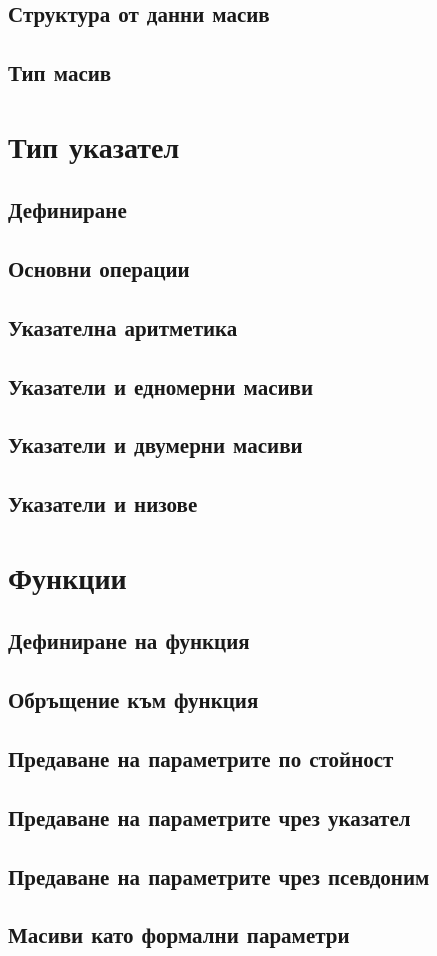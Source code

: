 \documentclass[fleqn,12pt]{article}
\begin{document}
\begin{flushleft}
\subsection{Структура от данни масив}
\subsection{Тип масив}

\section{Тип указател}
\subsection{Дефиниране}
\subsection{Основни операции}
\subsection{Указателна аритметика}
\subsection{Указатели и едномерни масиви}
\subsection{Указатели и двумерни масиви}
\subsection{Указатели и низове}

\section{Функции}
\subsection{Дефиниране на функция}
\subsection{Обръщение към функция}
\subsection{Предаване на параметрите по стойност}
\subsection{Предаване на параметрите чрез указател}
\subsection{Предаване на параметрите чрез псевдоним}
\subsection{Масиви като формални параметри}

\end{flushleft}
\end{document}
